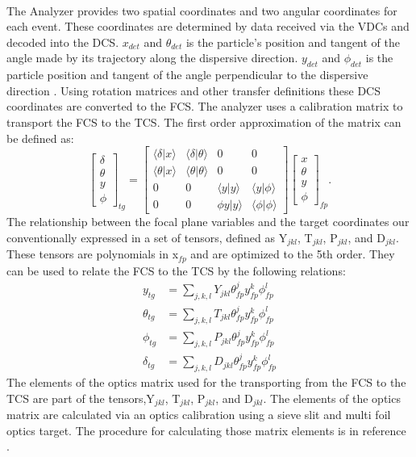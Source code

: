 \paragraph{} The Analyzer provides two spatial coordinates and two angular coordinates for each event. These coordinates are determined by data received via the VDCs and decoded into the DCS. $x_{det}$ and $\theta_{det}$ is the particle's position and tangent of the angle made by its trajectory along the dispersive direction. $y_{det}$ and $\phi_{det}$ is the particle position and tangent of the angle perpendicular to the dispersive direction \cite{optics}. Using rotation matrices and other transfer definitions these DCS coordinates are converted to the FCS. The analyzer uses a calibration matrix to transport the FCS to the TCS. The first order approximation of the matrix can be defined as:
\begin{equation}
\begin{bmatrix}
	\delta \\
	\theta \\
	y      \\
	\phi   
\end{bmatrix}_{tg}
=
\begin{bmatrix}
	\langle \delta \vert x \rangle &\langle \delta \vert \theta \rangle & 0 & 0\\
	\langle \theta \vert x \rangle &\langle \theta \vert \theta \rangle & 0 & 0\\
	0 & 0 & \langle y \vert y \rangle &\langle y \vert \phi \rangle\\
	0 & 0 & \phi y \vert y \rangle &\langle \phi \vert \phi \rangle
\end{bmatrix}
\begin{bmatrix}
	x     \\    
	\theta \\
	y      \\
	\phi   
\end{bmatrix}_{fp}.
\end{equation}
The relationship between the focal plane variables and the target coordinates our conventionally expressed in a set of tensors, defined as Y$_{jkl}$, T$_{jkl}$, P$_{jkl}$, and D$_{jkl}$. These tensors are polynomials in x$_{fp}$ and are optimized to the 5th order. They can be used to relate the FCS to the TCS by the following relations:
\begin{align}
y_{tg} &= \sum_{j,k,l} Y_{jkl}\theta^j_{fp}y^k_{fp}\phi^l_{fp} \\
\theta_{tg} &= \sum_{j,k,l} T_{jkl}\theta^j_{fp}y^k_{fp}\phi^l_{fp} \\
\phi_{tg} &= \sum_{j,k,l} P_{jkl}\theta^j_{fp}y^k_{fp}\phi^l_{fp}  \\
\delta_{tg} &= \sum_{j,k,l} D_{jkl}\theta^j_{fp}y^k_{fp}\phi^l_{fp} 
\end{align}
The elements of the optics matrix used for the transporting from the FCS to the TCS are part of the tensors,Y$_{jkl}$, T$_{jkl}$, P$_{jkl}$, and D$_{jkl}$. The elements of the optics matrix are calculated via an optics calibration using a sieve slit and multi foil optics target. The procedure for calculating those matrix elements is in reference \cite{optics}. 
